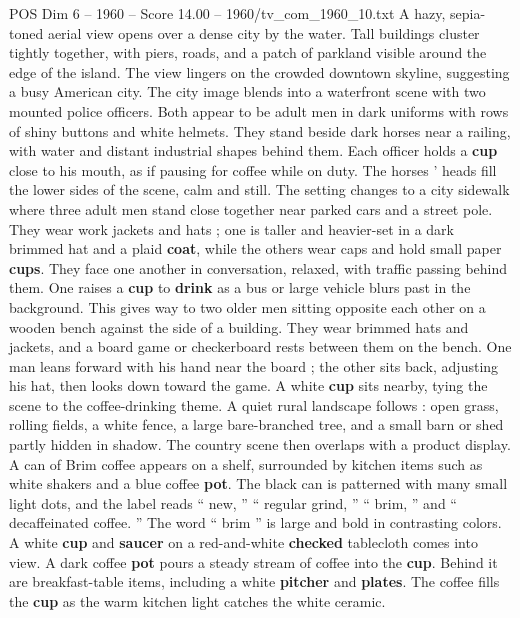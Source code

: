 \begin{textsample}{POS Dim 6 – 1960 – Score 14.00 – 1960/tv\_com\_1960\_10.txt}  \label{ex:f6_pos_026}
A hazy, sepia-toned aerial view opens over a dense city by the water.
Tall buildings cluster tightly together, with piers, roads, and a patch of parkland visible around the edge of the island.
The view lingers on the crowded downtown skyline, suggesting a busy American city.
The city image blends into a waterfront scene with two mounted police officers.
Both appear to be adult men in dark uniforms with rows of shiny buttons and white helmets.
They stand beside dark horses near a railing, with water and distant industrial shapes behind them.
Each officer holds a \textbf{cup} close to his mouth, as if pausing for coffee while on duty.
The horses ’ heads fill the lower sides of the scene, calm and still.
The setting changes to a city sidewalk where three adult men stand close together near parked cars and a street pole.
They wear work jackets and hats ; one is taller and heavier-set in a dark brimmed hat and a plaid \textbf{coat}, while the others wear caps and hold small paper \textbf{cups}.
They face one another in conversation, relaxed, with traffic passing behind them.
One raises a \textbf{cup} to \textbf{drink} as a bus or large vehicle blurs past in the background.
This gives way to two older men sitting opposite each other on a wooden bench against the side of a building.
They wear brimmed hats and jackets, and a board game or checkerboard rests between them on the bench.
One man leans forward with his hand near the board ; the other sits back, adjusting his hat, then looks down toward the game.
A white \textbf{cup} sits nearby, tying the scene to the coffee-drinking theme.
A quiet rural landscape follows : open grass, rolling fields, a white fence, a large bare-branched tree, and a small barn or shed partly hidden in shadow.
The country scene then overlaps with a product display.
A can of Brim coffee appears on a shelf, surrounded by kitchen items such as white shakers and a blue coffee \textbf{pot}.
The black can is patterned with many small light dots, and the label reads “ new, ” “ regular grind, ” “ brim, ” and “ decaffeinated coffee. ” The word “ brim ” is large and bold in contrasting colors.
A white \textbf{cup} and \textbf{saucer} on a red-and-white \textbf{checked} tablecloth comes into view.
A dark coffee \textbf{pot} pours a steady stream of coffee into the \textbf{cup}.
Behind it are breakfast-table items, including a white \textbf{pitcher} and \textbf{plates}.
The coffee fills the \textbf{cup} as the warm kitchen light catches the white ceramic.

\end{textsample}
